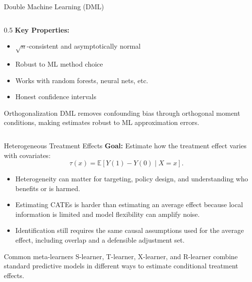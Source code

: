 \documentclass[aspectratio=169,11pt]{beamer}
\begin{document}
\begin{frame}{Double Machine Learning (DML)}
\begin{columns}
\begin{column}{0.5\textwidth}
\textbf{Key Properties:}
\begin{itemize}
\item $\sqrt{n}$-consistent and asymptotically normal
\item Robust to ML method choice
\item Works with random forests, neural nets, etc.
\item Honest confidence intervals
\end{itemize}

\begin{alertblock}{Orthogonalization}
DML removes confounding bias through orthogonal moment conditions, making estimates robust to ML approximation errors.
\end{alertblock}
\end{column}
\end{columns}
\end{frame}

\begin{frame}{Heterogeneous Treatment Effects}
\textbf{Goal:} Estimate how the treatment effect varies with covariates:
\[
  \tau(x)=\mathbb{E}[Y(1)-Y(0)\mid X=x].
\]

\begin{itemize}
  \item Heterogeneity can matter for targeting, policy design, and understanding who benefits or is harmed.
  \item Estimating CATEs is harder than estimating an average effect because local information is limited and model flexibility can amplify noise.
  \item Identification still requires the same causal assumptions used for the average effect, including overlap and a defensible adjustment set.
\end{itemize}

\begin{block}{Common meta-learners}
S-learner, T-learner, X-learner, and R-learner combine standard predictive models in different ways to estimate conditional treatment effects.
\end{block}
\end{frame}
\end{document}
